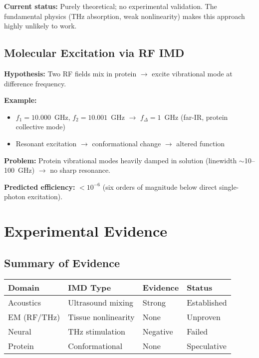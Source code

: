 \begin{warningbox}
\textbf{Current status:} Purely theoretical; no experimental validation. The fundamental physics (THz absorption, weak nonlinearity) makes this approach highly unlikely to work.
\end{warningbox}

\subsection{Molecular Excitation via RF IMD}

\textbf{Hypothesis:} Two RF fields mix in protein $\rightarrow$ excite vibrational mode at difference frequency.

\textbf{Example:}
\begin{itemize}
\item $f_1 = 10.000$~GHz, $f_2 = 10.001$~GHz $\rightarrow$ $f_{\Delta} = 1$~GHz (far-IR, protein collective mode)
\item Resonant excitation $\rightarrow$ conformational change $\rightarrow$ altered function
\end{itemize}

\textbf{Problem:} Protein vibrational modes heavily damped in solution (linewidth $\sim$10--100~GHz) $\rightarrow$ no sharp resonance.

\textbf{Predicted efficiency:} $<10^{-6}$ (six orders of magnitude below direct single-photon excitation).

\section{Experimental Evidence}

\subsection{Summary of Evidence}

\begin{center}
\begin{tabular}{@{}llll@{}}
\toprule
\textbf{Domain} & \textbf{IMD Type} & \textbf{Evidence} & \textbf{Status} \\
\midrule
Acoustics & Ultrasound mixing & Strong & Established \\
EM (RF/THz) & Tissue nonlinearity & None & Unproven \\
Neural & THz stimulation & Negative & Failed \\
Protein & Conformational & None & Speculative \\
\bottomrule
\end{tabular}
\end{center}

